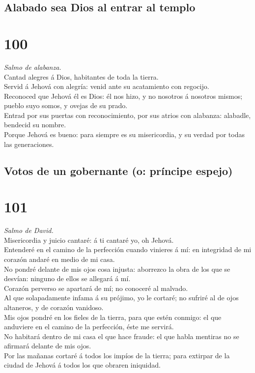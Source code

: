 \hypertarget{alabado-sea-dios-al-entrar-al-templo}{%
\subsection{Alabado sea Dios al entrar al
templo}\label{alabado-sea-dios-al-entrar-al-templo}}

\hypertarget{section-99}{%
\section{100}\label{section-99}}

 \emph{Salmo de alabanza.}\\
Cantad alegres á Dios, habitantes de toda la tierra.\\
 Servid á Jehová con alegría: venid ante su acatamiento con
regocijo.\\
 Reconoced que Jehová él es Dios: él nos hizo, y no nosotros
á nosotros mismos; pueblo suyo somos, y ovejas de su prado.\\
 Entrad por sus puertas con reconocimiento, por sus atrios
con alabanza: alabadle, bendecid su nombre.\\
 Porque Jehová es bueno: para siempre es su misericordia, y
su verdad por todas las generaciones.

\hypertarget{votos-de-un-gobernante-o-pruxedncipe-espejo}{%
\subsection{Votos de un gobernante (o: príncipe
espejo)}\label{votos-de-un-gobernante-o-pruxedncipe-espejo}}

\hypertarget{section-100}{%
\section{101}\label{section-100}}

 \emph{Salmo de David.}\\
Misericordia y juicio cantaré: á ti cantaré yo, oh Jehová.\\
 Entenderé en el camino de la perfección cuando vinieres á
mí: en integridad de mi corazón andaré en medio de mi casa.\\
 No pondré delante de mis ojos cosa injusta: aborrezco la
obra de los que se desvían: ninguno de ellos se allegará á mí.\\
 Corazón perverso se apartará de mí; no conoceré al
malvado.\\
 Al que solapadamente infama á su prójimo, yo le cortaré; no
sufriré al de ojos altaneros, y de corazón vanidoso.\\
 Mis ojos pondré en los fieles de la tierra, para que estén
conmigo: el que anduviere en el camino de la perfección, éste me
servirá.\\
 No habitará dentro de mi casa el que hace fraude: el que
habla mentiras no se afirmará delante de mis ojos.\\
 Por las mañanas cortaré á todos los impíos de la tierra;
para extirpar de la ciudad de Jehová á todos los que obraren iniquidad.

